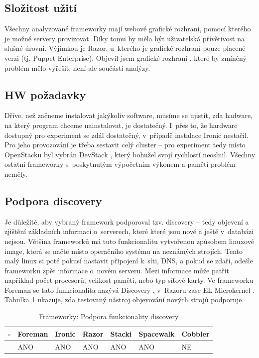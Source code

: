 \subsection{Složitost užití}

Všechny analyzované frameworky mají webové grafické rozhraní, pomocí kterého je možné servery provizovat. Díky tomu by měla být uživatelská přívětivost na slušné úrovni. Výjimkou je Razor, u~kterého je grafické rozhraní pouze placené verzi (tj. Puppet Enterprise). Objevil jsem grafické rozhraní \cite{puppet-dashboard}, které by zmíněný problém mělo vyřešit, není ale součástí analýzy.

\subsection{HW požadavky}

Dříve, než začneme instalovat jakýkoliv software, musíme se ujistit, zda hadware, na který program chceme nainstalovat, je dostatečný. I~přes to, že hardware dostupný pro experiment se zdál dostatečný, v~případě instalace Ironic nestačil. Pro jeho provozování je třeba sestavit celý cluster -- pro experiment tedy místo OpenStacku byl vybrán DevStack \cite{devstack}, který bohužel svojí rychlostí neoslnil. Všechny ostatní frameworky s~poskytnutým výpočetním výkonem a pamětí problém neměly.


\subsection{Podpora discovery}

Je důležité, aby vybraný framework podporoval tzv. discovery -- tedy objevení a zjištění základních informací o~serverech, které které jsou nové a ještě v~databázi nejsou. Většina frameworků má tuto funkcionalitu vytvořenou způsobem linuxové image, která se načte místo operačního systému na neznámých strojích. Tento malý linux si poté pokusí nastavit připojení k~síti, DNS, a pokud se zdaří, odešle frameworku zpět informace o~novém serveru. Mezi informace může patřit například počet procesorů, velikost paměti, nebo typ síťové karty. Ve frameworku Foreman se tato funkcionalita nazývá Discovery \cite{foreman-discovery}, v~Razoru zase EL Microkernel \cite{el-microkernel}. Tabulka \ref{Frameworky_discovery} ukazuje, zda testovaný nástroj objevování nových strojů podporuje.



\begin{table}[h]
\centering
\caption{Frameworky: Podpora funkcionality discovery}
\label{Frameworky_discovery}
\begin{tabular}{lllllll}
\toprule

- & Foreman & Ironic & Razor & Stacki & Spacewalk & Cobbler \\ \midrule
  & ANO        &  ANO      &  ANO     & ANO       &  ANO         & NE
\end{tabular}
\end{table}


